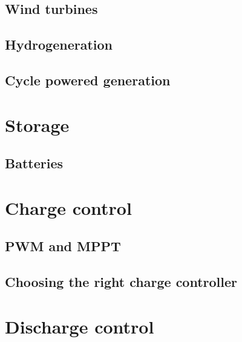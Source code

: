 \documentclass[letterpaper,10pt,english]{sphinxmanual}
\begin{document}
\section{Wind turbines}
\label{\detokenize{generation:wind-turbines}}

\section{Hydro\sphinxhyphen{}generation}
\label{\detokenize{generation:hydro-generation}}

\section{Cycle powered generation}
\label{\detokenize{generation:cycle-powered-generation}}

\chapter{Storage}
\label{\detokenize{storage:storage}}\label{\detokenize{storage::doc}}

\section{Batteries}
\label{\detokenize{storage:batteries}}

\chapter{Charge control}
\label{\detokenize{charge_control:charge-control}}\label{\detokenize{charge_control::doc}}

\section{PWM and MPPT}
\label{\detokenize{charge_control:pwm-and-mppt}}

\section{Choosing the right charge controller}
\label{\detokenize{charge_control:choosing-the-right-charge-controller}}

\chapter{Discharge control}
\label{\detokenize{discharge_control:discharge-control}}\label{\detokenize{discharge_control::doc}}
\end{document}
